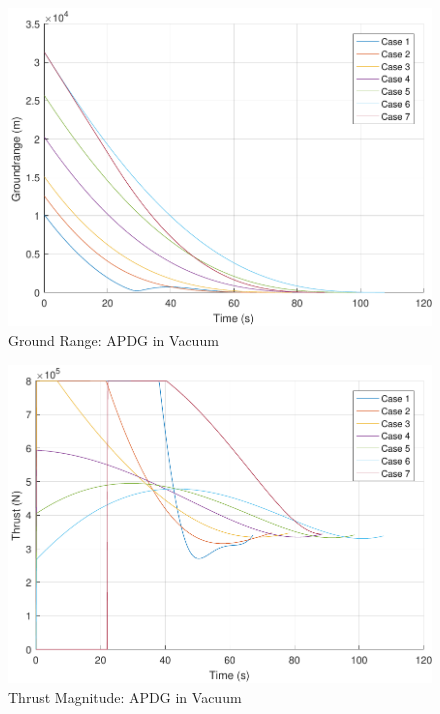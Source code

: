 \begin{figure}[H]
	\centering
	\begin{minipage}{4.3 in}
		\includegraphics[width=\linewidth]{Figures/rngpowvac.pdf}
		\caption{Ground Range: APDG in Vacuum \label{fig:rngpowvac} }
	\end{minipage}
\end{figure}

\begin{figure}[H]
	\centering
	\begin{minipage}{4.3 in}
		\includegraphics[width=\linewidth]{Figures/thrpowvac.pdf}
		\caption{Thrust Magnitude: APDG in Vacuum \label{fig:thrpowvac} }
	\end{minipage}
\end{figure}


